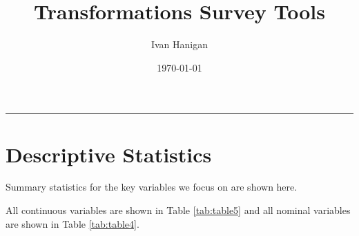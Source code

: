 \documentclass[a4paper]{article}
\title{Transformations Survey Tools}
\author{Ivan Hanigan}
\date{\today}
\begin{document}
\maketitle

\tableofcontents
\hrule

\section{Descriptive Statistics}
\label{sec-1}

Summary statistics for the key variables we focus on are shown here.

All continuous variables are shown in Table \ref{tab:table5} and all nominal variables are shown in Table \ref{tab:table4}.   



\end{document}
